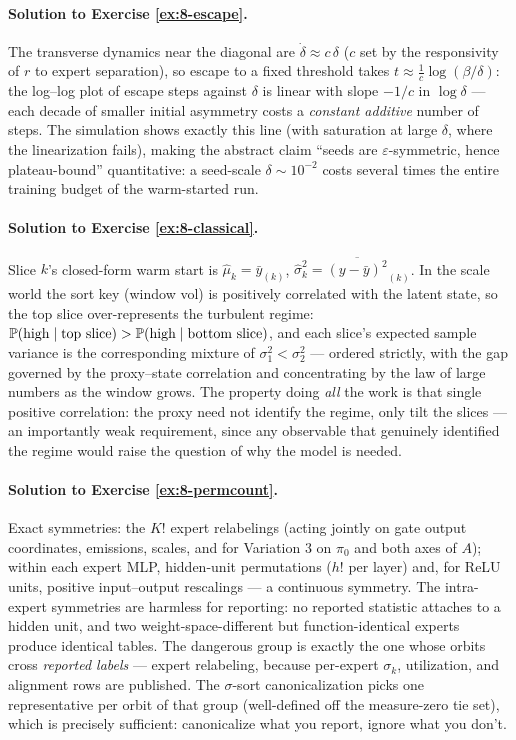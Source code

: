 \paragraph{Solution to Exercise \ref{ex:8-escape}.}
The transverse dynamics near the diagonal are $\dot\delta \approx
c\,\delta$ ($c$ set by the responsivity of $r$ to expert separation),
so escape to a fixed threshold takes $t \approx \tfrac1c
\log(\beta/\delta)$: the log--log plot of escape steps against
$\delta$ is linear with slope $-1/c$ in $\log\delta$ --- each decade of
smaller initial asymmetry costs a \emph{constant additive} number of
steps. The simulation shows exactly this line (with saturation at
large $\delta$, where the linearization fails), making the abstract
claim ``seeds are $\varepsilon$-symmetric, hence plateau-bound''
quantitative: a seed-scale $\delta \sim 10^{-2}$ costs several times
the entire training budget of the warm-started run.

\paragraph{Solution to Exercise \ref{ex:8-classical}.}
Slice $k$'s closed-form warm start is $\hat\mu_k = \bar y_{(k)}$,
$\hat\sigma_k^2 = \overline{(y - \bar y)^2}_{(k)}$. In the scale world
the sort key (window vol) is positively correlated with the latent
state, so the top slice over-represents the turbulent regime:
$\mathbb{P}(\text{high} \mid \text{top slice}) > \mathbb{P}(\text{high} \mid
\text{bottom slice})$, and each slice's expected sample variance is the
corresponding mixture of $\sigma_1^2 < \sigma_2^2$ --- ordered
strictly, with the gap governed by the proxy--state correlation and
concentrating by the law of large numbers as the window grows. The
property doing \emph{all} the work is that single positive correlation:
the proxy need not identify the regime, only tilt the slices --- an
importantly weak requirement, since any observable that genuinely
identified the regime would raise the question of why the model is
needed.

\paragraph{Solution to Exercise \ref{ex:8-permcount}.}
Exact symmetries: the $K!$ expert relabelings (acting jointly on gate
output coordinates, emissions, scales, and for Variation 3 on $\pi_0$
and both axes of $A$); within each expert MLP, hidden-unit permutations
($h!$ per layer) and, for ReLU units, positive input--output rescalings
--- a continuous symmetry. The intra-expert symmetries are harmless for
reporting: no reported statistic attaches to a hidden unit, and two
weight-space-different but function-identical experts produce identical
tables. The dangerous group is exactly the one whose orbits cross
\emph{reported labels} --- expert relabeling, because per-expert
$\sigma_k$, utilization, and alignment rows are published. The
$\sigma$-sort canonicalization picks one representative per orbit of
that group (well-defined off the measure-zero tie set), which is
precisely sufficient: canonicalize what you report, ignore what you
don't.

